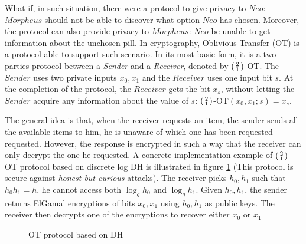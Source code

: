 What if, in such situation, there were a protocol to give privacy to
\(Neo\): \(Morpheus\) should not be able to discover what option \(Neo\) has chosen. Moreover, the
protocol can also provide privacy to \(Morpheus\): \(Neo\) be unable to get information about the unchosen pill. In cryptography, Oblivious Transfer (OT) is a
protocol able to support such scenario. 
In its most basic form, it is a
two-parties protocol between a \textit{Sender} and a \textit{Receiver}, denoted
by \(\begin{psmallmatrix} 2 \\ 1 \end{psmallmatrix} \)-OT. The \(Sender\) uses
two private inputs \(x_{0}, x_{1}\) and the \(Receiver\) uses one input bit
\(s\). At the completion of the protocol, the \(Receiver\) gets the bit
\(x_{s}\), without letting the \(Sender\) acquire any information about the value of
\(s\): \(\begin{psmallmatrix} 2 \\ 1 \end{psmallmatrix}
\)-OT\((x_{0},x_{1};s) = x_{s}\).

The general idea is that, when the receiver requests an item, the sender sends
all the available items to him, he is unaware of which one has been requested
requested. However, the response is encrypted in such a way that the receiver
can only decrypt the one he requested. A concrete implementation example of
\(\begin{psmallmatrix} 2 \\ 1 \end{psmallmatrix} \)-OT protocol based on
discrete log DH is illustrated in figure \ref{fig:DH21OT} (This protocol is
secure against \textit{honest but curious} attacks). The receiver picks
\(h_{0},h_{1}\) such that \(h_{0}h_{1} = h\), he cannot access both
\(\log_{g}h_{0}\) and \(\log_{g}h_{1}\). Given \(h_{0}, h_{1}\), the sender
returns ElGamal encryptions of bits \(x_{0}, x_{1}\) using \(h_{0},h_{1}\) as
public keys. The receiver then decrypts one of the encryptions to recover either
\(x_{0} \text{ or } x_{1}\)

\begin{figure}[htbp!] 
  \centering
  \caption{OT protocol based on DH}
  \label{fig:DH21OT}
\end{figure}

